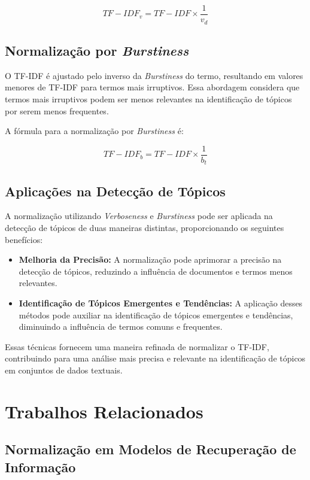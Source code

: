 \documentclass[runningheads]{llncs}
\begin{document}
\[
TF-IDF_{v} = TF-IDF \times \frac{1}{v_d}
\]

\subsection{Normalização por \textit{Burstiness}}

O TF-IDF é ajustado pelo inverso da \textit{Burstiness} do termo, resultando em valores menores de TF-IDF para termos mais irruptivos. Essa abordagem considera que termos mais irruptivos podem ser menos relevantes na identificação de tópicos por serem menos frequentes.

A fórmula para a normalização por \textit{Burstiness} é:

\[
TF-IDF_{b} = TF-IDF \times \frac{1}{b_t}
\]

\subsection{Aplicações na Detecção de Tópicos}

A normalização utilizando \textit{Verboseness} e \textit{Burstiness} pode ser aplicada na detecção de tópicos de duas maneiras distintas, proporcionando os seguintes benefícios:

\begin{itemize}
  \item \textbf{Melhoria da Precisão:} A normalização pode aprimorar a precisão na detecção de tópicos, reduzindo a influência de documentos e termos menos relevantes.
  
  \item \textbf{Identificação de Tópicos Emergentes e Tendências:} A aplicação desses métodos pode auxiliar na identificação de tópicos emergentes e tendências, diminuindo a influência de termos comuns e frequentes.
\end{itemize}

Essas técnicas fornecem uma maneira refinada de normalizar o TF-IDF, contribuindo para uma análise mais precisa e relevante na identificação de tópicos em conjuntos de dados textuais.


\section{Trabalhos Relacionados}

\subsection{Normalização em Modelos de Recuperação de Informação}
\end{document}
